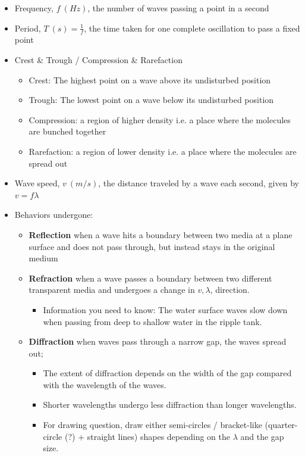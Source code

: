 \documentclass[a4paper,12pt]{article}
\begin{document}
\begin{itemize}
\begin{itemize}
        \item For longitudinal waves, \(\lambda\) can be measured from the center of one compression to the center of the next.
    \end{itemize}
    \item Frequency, \(f\ (Hz)\), the number of waves passing a point in a second
    \item Period, \(T\ (s)=\frac{1}{f}\), the time taken for one complete oscillation to pass a fixed point
    \item Crest \& Trough / Compression \& Rarefaction
    \begin{itemize}
        \item Crest: The highest point on a wave above its undisturbed position
        \item Trough: The lowest point on a wave below its undisturbed position
        \item Compression: a region of higher density i.e. a place where the molecules are bunched together
        \item Rarefaction: a region of lower density i.e. a place where the molecules are spread out
    \end{itemize}
    \item Wave speed, \(v\ (m/s)\), the distance traveled by a wave each second, given by \textbf{\(v=f\lambda\)}
    \item Behaviors undergone:
    \begin{itemize}
        \item \textbf{Reflection} when a wave hits a boundary between two media at a plane surface and does not pass through, but instead stays in the original medium
        \item \textbf{Refraction} when a wave passes a boundary between two different transparent media and undergoes a change in \(v,\lambda\), direction.
        \begin{itemize}
            \item Information you need to know: The water surface waves slow down when passing from deep to shallow water in the ripple tank.
        \end{itemize}
        \item \textbf{Diffraction} when waves pass through a narrow gap, the waves spread out;
        \begin{itemize}
            \item The extent of diffraction depends on the width of the gap compared with the wavelength of the waves.
            \item Shorter wavelengths undergo less diffraction than longer wavelengths.
            \item For drawing question, draw either semi-circles / bracket-like (quarter-circle (?) + straight lines) shapes depending on the \(\lambda\) and the gap size.
        \end{itemize}
    \end{itemize}
\end{itemize}
\end{document}
